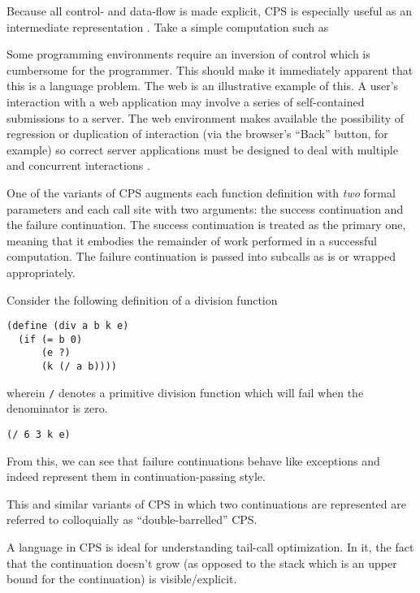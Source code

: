 \documentclass[ms]{byuprop}
\newcounter{definition}
\newcounter{example}
\begin{document}
Because all control- and data-flow is made explicit, CPS is especially useful as an 
intermediate representation \cite{flanagan1993essence}. Take a simple computation such as

Some programming environments require an inversion of control which is cumbersome for the programmer. This should make it immediately apparent that this is a language problem. The web is an illustrative example of this. A user's interaction with a web application may involve a series of self-contained submissions to a server. The web environment makes available the possibility of regression or duplication of interaction (via the browser's ``Back'' button, for example) so correct server applications must be designed to deal with multiple and concurrent interactions \cite{queinnec2003inverting}.

One of the variants of CPS augments each function definition with \emph{two} formal 
parameters and each call site with two arguments: the success continuation and the 
failure continuation. The success continuation is treated as the primary one, meaning 
that it embodies the remainder of work performed in a successful computation. The 
failure continuation is passed into subcalls as is or wrapped appropriately.

Consider the following definition of a division function
\begin{verbatim}
(define (div a b k e)
  (if (= b 0)
      (e ?)
      (k (/ a b))))
\end{verbatim}
wherein \texttt{/} denotes a primitive division function which will fail when the 
denominator is zero.


\begin{verbatim}
(/ 6 3 k e)
\end{verbatim}

From this, we can see that failure continuations behave like exceptions and indeed 
represent them in continuation-passing style.

This and similar variants of CPS in which two continuations are represented are 
referred to colloquially as ``double-barrelled'' CPS.

A language in CPS is ideal for understanding tail-call optimization. In it, the fact that the 
continuation doesn't grow (as opposed to the stack which is an upper bound for the 
continuation) is visible/explicit. 
\end{document}
